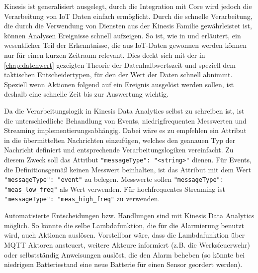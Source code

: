 Kinesis ist generalisiert ausgelegt, durch die Integration mit \AWSIOT{} Core wird jedoch die Verarbeitung von \ac{IoT} Daten einfach ermöglicht. Durch die schnelle Verarbeitung, die durch die Verwendung von Diensten aus der Kinesis Familie gewährleistet ist, können Analysen Ereignisse schnell aufzeigen. So ist, wie in  und  erläutert, ein wesentlicher Teil der Erkenntnisse, die aus \ac{IoT}-Daten gewonnen werden können nur für einen kurzen Zeitraum relevant. Dies deckt sich mit der in \autoref{chap:datenwert} gezeigten Theorie der Datenhalbwertszeit und speziell dem taktischen Entscheidertypen, für den der Wert der Daten schnell abnimmt. Speziell wenn Aktionen folgend auf ein Ereignis ausgelöst werden sollen, ist deshalb eine schnelle Zeit bis zur Auswertung wichtig.

Da die Verarbeitungslogik in Kinesis Data Analytics selbst zu schreiben ist, ist die unterschiedliche Behandlung von Events, niedrigfrequenten Messwerten und Streaming implementierungsabhängig. Dabei wäre es zu empfehlen ein Attribut in die übermittelten Nachrichten einzufügen, welches den geanauen Typ der Nachricht definiert und entsprechende Verarbeitungslogiken vereinfacht. Zu diesem Zweck soll das Attribut \texttt{{"messageType": "<string>"}} dienen. Für Events, die Definitionsgemäß keinen Messwert beinhalten, ist das Attribut mit dem Wert \texttt{{"messageType": "event"}} zu belegen. Messwerte sollen \texttt{{"messageType": "meas_low_freq"}} als Wert verwenden. Für hochfrequentes Streaming ist \texttt{{"messageType": "meas_high_freq"}} zu verwenden.

Automatisierte Entscheidungen bzw. Handlungen sind mit Kinesis Data Analytics möglich. So könnte die selbe Lambdafunktion, die für die Alarmierung benutzt wird, auch Aktionen auslösen. Vorstellbar wäre, dass die Lambdafunktion über \ac{MQTT} Aktoren ansteuert, weitere Akteure informiert (z.B. die Werksfeuerwehr) oder selbstständig Anweisungen auslöst, die den Alarm beheben (so könnte bei niedrigem Batteriestand eine neue Batterie für einen Sensor geordert werden). 



